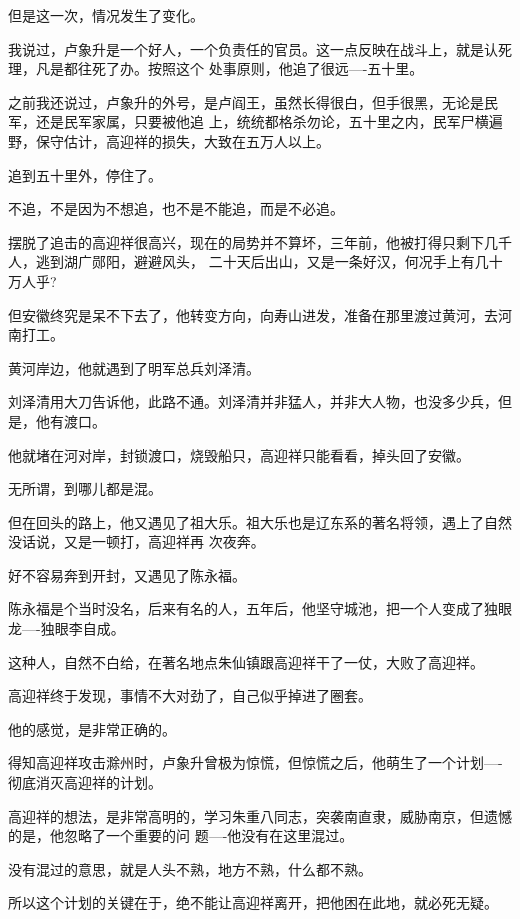 \documentclass[11pt,a4paper,onecolumn]{article}
\begin{document}
但是这一次，情况发生了变化。

我说过，卢象升是一个好人，一个负责任的官员。这一点反映在战斗上，就是认死理，凡是都往死了办。按照这个
处事原则，他追了很远----五十里。

之前我还说过，卢象升的外号，是卢阎王，虽然长得很白，但手很黑，无论是民军，还是民军家属，只要被他追
上，统统都格杀勿论，五十里之内，民军尸横遍野，保守估计，高迎祥的损失，大致在五万人以上。

追到五十里外，停住了。

不追，不是因为不想追，也不是不能追，而是不必追。

摆脱了追击的高迎祥很高兴，现在的局势并不算坏，三年前，他被打得只剩下几千人，逃到湖广郧阳，避避风头，
二十天后出山，又是一条好汉，何况手上有几十万人乎?

但安徽终究是呆不下去了，他转变方向，向寿山进发，准备在那里渡过黄河，去河南打工。

黄河岸边，他就遇到了明军总兵刘泽清。

刘泽清用大刀告诉他，此路不通。刘泽清并非猛人，并非大人物，也没多少兵，但是，他有渡口。

他就堵在河对岸，封锁渡口，烧毁船只，高迎祥只能看看，掉头回了安徽。

无所谓，到哪儿都是混。

但在回头的路上，他又遇见了祖大乐。祖大乐也是辽东系的著名将领，遇上了自然没话说，又是一顿打，高迎祥再
次夜奔。

好不容易奔到开封，又遇见了陈永福。

陈永福是个当时没名，后来有名的人，五年后，他坚守城池，把一个人变成了独眼龙----独眼李自成。

这种人，自然不白给，在著名地点朱仙镇跟高迎祥干了一仗，大败了高迎祥。

高迎祥终于发现，事情不大对劲了，自己似乎掉进了圈套。

他的感觉，是非常正确的。

得知高迎祥攻击滁州时，卢象升曾极为惊慌，但惊慌之后，他萌生了一个计划----彻底消灭高迎祥的计划。

高迎祥的想法，是非常高明的，学习朱重八同志，突袭南直隶，威胁南京，但遗憾的是，他忽略了一个重要的问
题----他没有在这里混过。

没有混过的意思，就是人头不熟，地方不熟，什么都不熟。

所以这个计划的关键在于，绝不能让高迎祥离开，把他困在此地，就必死无疑。

\section[\thesection]{}
\end{document}
